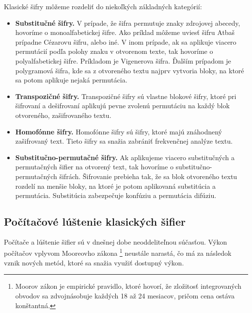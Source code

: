 Klasické šifry môžeme rozdeliť do niekoľkých základných kategórií:
\begin{itemize}

\item \textbf{Substitučné šifry.}
  V prípade, že šifra permutuje znaky zdrojovej abecedy, hovoríme o monoalfabetickej šifre.
  Ako príklad môžeme uviesť šifru Atbaš prípadne Cézarovu šifru, alebo iné.
  V inom prípade, ak sa aplikuje viacero permutácií podľa polohy znaku v otvorenom texte, tak hovoríme o polyalfabetickej šifre.
  Príkladom je Vigenerova šifra. Ďalším prípadom je polygramová šifra, kde sa z otvoreného textu najprv vytvoria bloky,
  na ktoré sa potom aplikuje nejaká permutácia.

\item \textbf{Transpozičné šifry.}
  Transpozičné šifry sú vlastne blokové šifry, ktoré pri šifrovaní a dešifrovaní aplikujú pevne zvolenú permutáciu na každý blok
  otvoreného, zašifrovaného textu.
  
\item \textbf{Homofónne šifry.}
  Homofónne šifry sú šifry, ktoré majú znáhodnený zašifrovaný text. Tieto šifry sa snažia zabrániť frekvenčnej analýze textu. 
  
\item \textbf{Substitučno-permutačné šifry.}
  Ak aplikujeme viacero substitučných a permutačných šifier na otvorený text, tak hovoríme o substitučno-permutačných šifrách.
  Šifrovanie prebieha tak, že sa blok otvoreného textu rozdelí na menšie bloky, na ktoré je potom aplikovaná substitúcia a permutácia.
  Substitúcia zabezpečuje konfúziu a permutácia difúziu.
  
\end{itemize}

\subsection{Počítačové lúštenie klasických šifier}
Počítače a lúštenie šifier sú v dnešnej dobe neoddeliteľnou súčasťou. Výkon počítačov vplyvom Mooreovho zákona \footnote{Moorov zákon je empirické pravidlo, ktoré hovorí, že zložitosť integrovaných obvodov sa zdvojnásobuje každých 18 až 24 mesiacov, pričom cena ostáva konštantná.} neustále narastá,
čo má za následok vznik nových metód, ktoré sa snažia využiť dostupný výkon.

